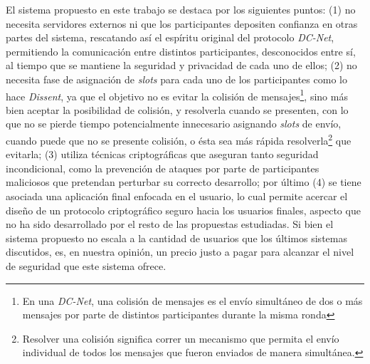 El sistema propuesto en este trabajo se destaca por los siguientes puntos: (1) 
no necesita servidores externos ni que los participantes depositen confianza 
en otras partes del sistema, rescatando así el espíritu original del protocolo 
\emph{DC-Net}, permitiendo la comunicación entre distintos participantes, 
desconocidos entre sí, al tiempo que se mantiene la seguridad y privacidad 
de cada uno de ellos; (2) no necesita fase de asignación de \emph{slots} para 
cada uno de los participantes como lo hace \emph{Dissent}, ya que el objetivo 
no es evitar la colisión de mensajes\footnote{En una \emph{DC-Net}, una 
colisión de mensajes es el envío simultáneo de dos o más mensajes por parte 
de distintos participantes durante la misma ronda}, sino más bien aceptar la 
posibilidad de colisión, y resolverla cuando se presenten, con lo que no se 
pierde tiempo potencialmente innecesario asignando \emph{slots} de envío, 
cuando puede que no se presente colisión, o ésta sea más rápida 
resolverla\footnote{Resolver una colisión significa correr un mecanismo que 
permita el envío individual de todos los mensajes que fueron enviados de manera 
simultánea.} que evitarla; (3) utiliza técnicas criptográficas que aseguran 
tanto seguridad incondicional, como la prevención de ataques por parte de 
participantes maliciosos que pretendan perturbar su correcto desarrollo; por 
último (4) se tiene asociada una aplicación final enfocada en el usuario, lo 
cual permite acercar el diseño de un protocolo criptográfico seguro hacia los 
usuarios finales, aspecto que no ha sido desarrollado por el resto de las 
propuestas estudiadas. Si bien el sistema propuesto no escala a la cantidad de 
usuarios que los últimos sistemas discutidos, es, en nuestra opinión, un 
precio justo a pagar para alcanzar el nivel de seguridad que este sistema 
ofrece.
